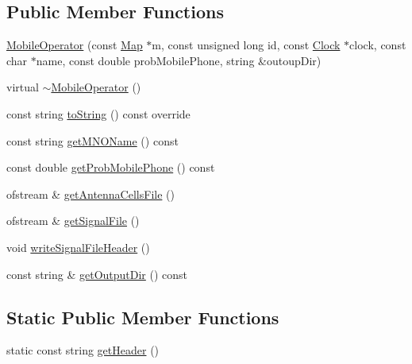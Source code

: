 \subsection*{Public Member Functions}
\begin{DoxyCompactItemize}
\item 
\hyperlink{class_mobile_operator_ad9649aeb34789b407d712a1539f7953d}{Mobile\+Operator} (const \hyperlink{class_map}{Map} $\ast$m, const unsigned long id, const \hyperlink{class_clock}{Clock} $\ast$clock, const char $\ast$name, const double prob\+Mobile\+Phone, string \&outoup\+Dir)
\item 
virtual \hyperlink{class_mobile_operator_af77920475ff630755355f67b8f5f2708}{$\sim$\+Mobile\+Operator} ()
\item 
const string \hyperlink{class_mobile_operator_aa83724a149499ef10678ad651a5b40df}{to\+String} () const override
\item 
const string \hyperlink{class_mobile_operator_a003a5d91f543eaf5ff11894bd462ac77}{get\+M\+N\+O\+Name} () const
\item 
const double \hyperlink{class_mobile_operator_afe59edb4ba22cea7fab968fdd1e2ce31}{get\+Prob\+Mobile\+Phone} () const
\item 
ofstream \& \hyperlink{class_mobile_operator_ae6aa3043d946fa97eba7032b9707e52a}{get\+Antenna\+Cells\+File} ()
\item 
ofstream \& \hyperlink{class_mobile_operator_ac39217182fd0ce7ef5da3b9018bcb965}{get\+Signal\+File} ()
\item 
void \hyperlink{class_mobile_operator_acbb238161ef223f7862e1ad19d2ede56}{write\+Signal\+File\+Header} ()
\item 
const string \& \hyperlink{class_mobile_operator_a58ac70813094ddefdf0ba2552ec31fe9}{get\+Output\+Dir} () const
\end{DoxyCompactItemize}
\subsection*{Static Public Member Functions}
\begin{DoxyCompactItemize}
\item 
static const string \hyperlink{class_mobile_operator_ad440c00732fbab02e41149fffe59a1c8}{get\+Header} ()
\end{DoxyCompactItemize}
